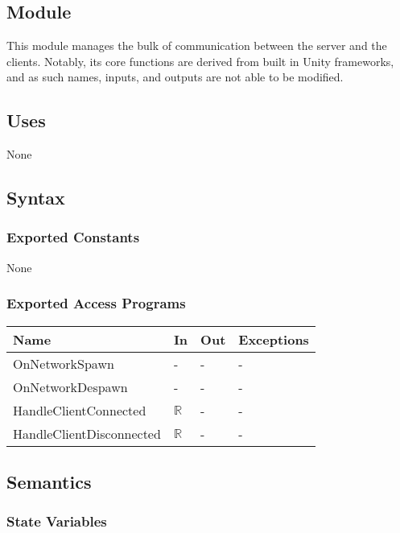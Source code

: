 \documentclass[12pt, titlepage]{article}
\begin{document}
\subsection{Module}

This module manages the bulk of communication between the server and the clients. Notably, its core functions are derived from built in Unity frameworks, and as such names, inputs, and outputs are not able to be modified. 

\subsection{Uses}

None

\subsection{Syntax}

\subsubsection{Exported Constants}

None

\subsubsection{Exported Access Programs}

\begin{center}
\begin{tabular}{p{5cm} p{4cm} p{4cm} p{2cm}}
\hline
\textbf{Name} & \textbf{In} & \textbf{Out} & \textbf{Exceptions} \\
\hline
OnNetworkSpawn & - & - & - \\
OnNetworkDespawn  & - & - & - \\
HandleClientConnected  & $\mathbb{R}$ & - & - \\
HandleClientDisconnected  & $\mathbb{R}$ & - & - \\
\hline
\end{tabular}
\end{center}

\subsection{Semantics}

\subsubsection{State Variables}
\end{document}
